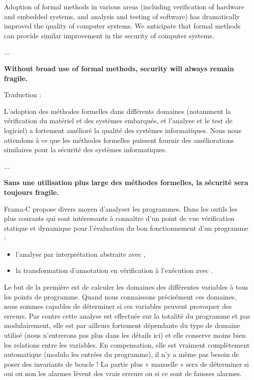 \documentclass[middle]{zmdocument}
\begin{document}
\begin{Quotation}
Adoption of formal methods in various areas (including verification of hardware
and embedded systems, and analysis and testing of software) has dramatically 
improved the quality of computer systems.  We anticipate that formal methods 
can provide similar improvement in the security of computer systems.

...

\textbf{Without broad use of formal methods, security will always remain fragile.}
\end{Quotation}



\begin{Spoiler}
Traduction :

L'adoption des méthodes formelles dans différents domaines (notamment la 
vérification du matériel et des systèmes embarqués, et l'analyse et le test
de logiciel) a fortement amélioré la qualité des systèmes informatiques. 
Nous nous attendons à ce que les méthodes formelles puissent fournir des 
améliorations similaires pour la sécurité des systèmes informatiques.

...

\textbf{Sans une utilisation plus large des méthodes formelles, la sécurité sera
toujours fragile.}
\end{Spoiler}






Frama-C propose divers moyen d'analyser les programmes. Dans les outils les
plus courants qui sont intéressants à connaître d'un point de vue vérification
statique et dynamique pour l'évaluation du bon fonctionnement d'un programme :



\begin{itemize}
\item l'analyse par interprétation abstraite avec 
,
\item la transformation d'annotation en vérification à l'exécution avec 
.
\end{itemize}


Le but de la première est de calculer les domaines des différentes variables à
tous les points de programme. Quand nous connaissons précisément ces domaines,
nous sommes capables de déterminer si ces variables peuvent provoquer des erreurs.
Par contre cette analyse est effectuée sur la totalité du programme et pas 
modulairement, elle est par ailleurs fortement dépendante du type de domaine 
utilisé (nous n'entrerons pas plus dans les détails ici) et elle conserve moins
bien les relations entre les variables. En compensation, elle est vraiment 
complètement automatique (modulo les entrées du programme), il n'y a même pas
besoin de poser des invariants de boucle ! La partie plus « manuelle » sera de
déterminer si oui ou non les alarmes lèvent des vrais erreurs ou si ce sont de
fausses alarmes.
\end{document}
